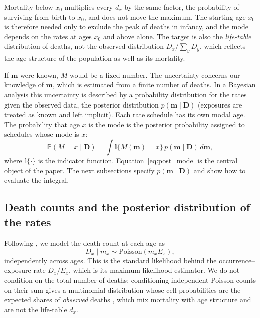 \documentclass[12pt, letterpaper]{article}
\begin{document}
Mortality below $x_0$ multiplies every $d_x$ by the same factor, the probability of surviving from birth to $x_0$, and does not move the maximum. The starting age $x_0$ is therefore needed only to exclude the peak of deaths in infancy, and the mode depends on the rates at ages $x_0$ and above alone. The target is also the \emph{life-table} distribution of deaths, not the observed distribution $D_x / \sum_y D_y$, which reflects the age structure of the population as well as its mortality.

If $\bm{m}$ were known, $M$ would be a fixed number. The uncertainty concerns our knowledge of $\bm{m}$, which is estimated from a finite number of deaths. In a Bayesian analysis this uncertainty is described by a probability distribution for the rates given the observed data, the posterior distribution $p(\bm{m} \mid \bm{D})$ (exposures are treated as known and left implicit). Each rate schedule has its own modal age. The probability that age $x$ is the mode is the posterior probability assigned to schedules whose mode is $x$:
\begin{equation}
\mathbb{P}(M = x \mid \bm{D}) = \int \mathbb{I}\{M(\bm{m}) = x\} \, p(\bm{m} \mid \bm{D}) \, d\bm{m},
\label{eq:post_mode}
\end{equation}
where $\mathbb{I}\{\cdot\}$ is the indicator function. Equation~\eqref{eq:post_mode} is the central object of the paper. The next subsections specify $p(\bm{m} \mid \bm{D})$ and show how to evaluate the integral.

\subsection{Death counts and the posterior distribution of the rates}
\label{sec:posterior}

Following \citet{brillinger1986biometrics}, we model the death count at each age as
\begin{equation}
D_x \mid m_x \sim \text{Poisson}(m_x E_x),
\label{eq:poisson}
\end{equation}
independently across ages. This is the standard likelihood behind the occurrence--exposure rate $D_x / E_x$, which is its maximum likelihood estimator. We do not condition on the total number of deaths: conditioning independent Poisson counts on their sum gives a multinomial distribution whose cell probabilities are the expected shares of \emph{observed} deaths \citep{bishop1975discrete}, which mix mortality with age structure and are not the life-table $d_x$.
\end{document}
